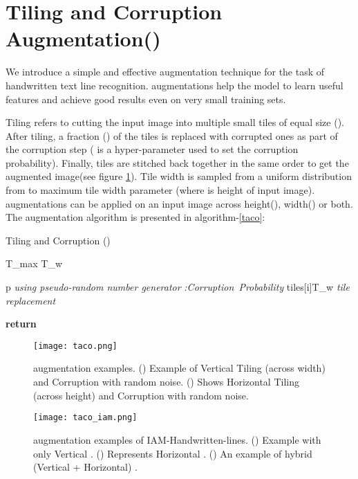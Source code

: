 \documentclass{article}
\begin{document}
\section{Tiling and Corruption Augmentation()} \label{taco_section}
We introduce a simple and effective augmentation technique for the task of handwritten text line recognition.  augmentations help the model to learn useful features and achieve good results even on very small training sets. 

Tiling refers to cutting the input image into multiple small tiles of equal size (). After tiling, a fraction () of the tiles is replaced with corrupted ones as part of the corruption step ( is a hyper-parameter used to set the corruption probability). Finally, tiles are stitched back together in the same order to get the augmented image(see figure \ref{fig:TACo}). Tile width  is sampled from a uniform distribution from  to maximum tile width parameter  (where  is height of input image).  augmentations can be applied on an input image across height(), width() or both. The  augmentation algorithm is presented in algorithm-\ref{taco}:

\makeatletter
\def\BState{\State\hskip-\ALG@thistlm}
\makeatother

\begin{algorithm}
\caption{Tiling and Corruption ()}\label{taco}
\begin{algorithmic}[1]
\State 
\State {}T_{max}
\State T_w

    \For {}
        \State p
        \Comment \emph{using pseudo-random number generator}
            \If { <= }
                \Comment \emph{:Corruption\ Probability}
                \State tiles[i]T_w
                \Comment \emph{tile replacement}
            \EndIf
    \EndFor
    
\State 
\State \textbf{return} {}
\EndProcedure
\end{algorithmic}
\end{algorithm}

\begin{figure}
  \centering
  \texttt{[image: taco.png]}
  \caption{ augmentation examples. () Example of Vertical Tiling (across width) and Corruption with random noise. () Shows Horizontal Tiling (across height) and Corruption with random noise.}
  \label{fig:TACo}
\end{figure}

\begin{figure}
  \centering
  \texttt{[image: taco\_iam.png]}
  \caption{ augmentation examples of IAM-Handwritten-lines. () Example with only Vertical . () Represents Horizontal . () An example of hybrid (Vertical + Horizontal) .}
  \label{fig:taco_iam}
\end{figure}
\end{document}
